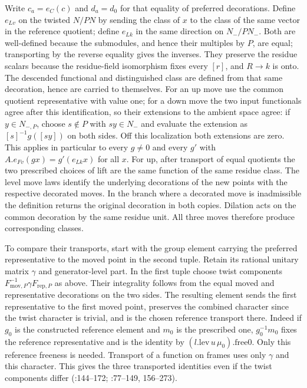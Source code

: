 Write $c_a=e_C(c)$ and $d_a=d_0$ for that equality of preferred
decorations. Define $e_{Lv}$ on the twisted $N/PN$ by sending the
class of $x$ to the class of the same vector in the reference quotient;
define $e_{Lk}$ in the same direction on $N_-/PN_-$. Both are
well-defined because the submodules, and hence their multiples by $P$,
are equal; transporting by the reverse equality gives the inverses. They preserve the residue scalars
because the residue-field isomorphism fixes every $[r]$, and $R\to k$
is onto. The descended functional and distinguished class are defined
from that same decoration, hence are carried to themselves. For an
up move use the common quotient representative with value one; for a
down move the two input functionals agree after this identification,
so their extensions to the ambient space agree: if $y\in N_{-,P}$,
choose $s\notin P$ with $sy\in N_-$ and evaluate the extension as
$[s]^{-1}g([sy])$ on both sides. Off this localization both extensions
are zero. This applies in particular to every $g\ne0$ and every $g'$
with $A.e_{Fv}(g x)=g'(e_{Lk}x)$ for all $x$. For up, after transport
of equal quotients the two prescribed choices of lift are the same
function of the same residue class. The level move laws
identify the underlying decorations of the new points with the
respective decorated moves. In the branch where a decorated move is
inadmissible the definition returns the original decoration in both
copies. Dilation acts on the common decoration by the same residue unit.
All three moves therefore produce corresponding classes.

To compare their transports, start with the group element carrying
the preferred representative to the moved point in the second tuple.
Retain its rational unitary matrix $\gamma$ and generator-level part.
In the first tuple choose twist components
$F_{\mathrm{mov},P}^{-1}\gamma F_{\mathrm{rep},P}$ as above. Their
integrality follows from the equal moved and representative decorations
on the two sides. The resulting element sends the first representative
to the first moved point, preserves the combined character since the
twist character is trivial, and is the chosen reference transport there.
Indeed if $g_0$ is the constructed reference element and $m_0$ is
the prescribed one, $g_0^{-1}m_0$ fixes the reference representative
and is the identity by $(l.\mathrm{lev}\,u\,\mu_0).\mathrm{free0}$.
Only this reference freeness is needed. Transport of a
function on frames uses only $\gamma$ and this character. This gives
the three transported identities even if the twist components differ
(:144--172;
:77--149, 156--273).

